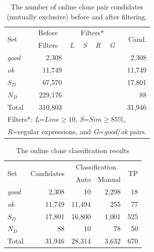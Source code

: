 \documentclass[sigconf,review, anonymous]{acmart}
\begin{document}
\begin{table}
	\centering
	\caption{The number of online clone pair condidates (mutually exclusive) before and after filtering.}
	\label{tab:online_clone_pairs}
	\small
	\begin{tabular}{l|r|c|c|c|c|r}
		\hline
		\multirow{2}{*}{Set} & \multicolumn{1}{c|}{Before} & \multicolumn{4}{c|}{Filters*} & \multirow{2}{*}{Cand.} \\ \cline{3-6}
		& \multicolumn{1}{c|}{Filters} & \textit{L} & \textit{S} & \textit{R} & \textit{G} & \\
		\hline 
		\multirow{1}{*}{\textit{good}} & 2,308 & & & & & 2,308 \\
		\multirow{1}{*}{\textit{ok}} & 11,749 & & & & & 11,749 \\
		\multirow{1}{*}{$S_D$} & 67,570 & \checkmark & & \checkmark & \checkmark & 17,801 \\
		\multirow{1}{*}{$N_D$} & 229,176 & & \checkmark & \checkmark & \checkmark & 88 \\ 
		\hline
		Total  & 310,803 & & & & & 31,946 \\ 
		\hline
		\multicolumn{7}{l}{\scriptsize{Filters*: \textit{L}=$Line \geq 10$, \textit{S}=$Sim \geq 85\%$,}} \\
		\multicolumn{7}{l}{\scriptsize{\textit{R}=regular expressions, and \textit{G}=\textit{good}/\textit{ok} pairs.}} \\
	\end{tabular} %
\end{table}

\begin{table}
	\centering
	\caption{The online clone classification results}
	\label{tab:online_clone_classification_results}
	\small
	\begin{tabular}{l|r|r|r|r}
		\hline
		\multirow{2}{*}{Set} & \multirow{2}{*}{Candidates} & \multicolumn{2}{c|}{Classification} & \multirow{2}{*}{TP} \\ \cline{3-4}
		& & Auto & Manual & \\
		\hline 
		\multirow{1}{*}{\textit{good}} & 2,308 & 10 & 2,298 & 18 \\
		\multirow{1}{*}{\textit{ok}} & 11,749 & 11,494 & 255 & 77 \\
		\multirow{1}{*}{$S_D$} & 17,801 & 16,800 & 1,001 & 525 \\
		\multirow{1}{*}{$N_D$} & 88 & 10 & 78 & 50 \\ 
		\hline
		Total  & 31,946 & 28,314 & 3,632 & 670 \\ 
		\hline
	\end{tabular} %
\end{table}
\end{document}
